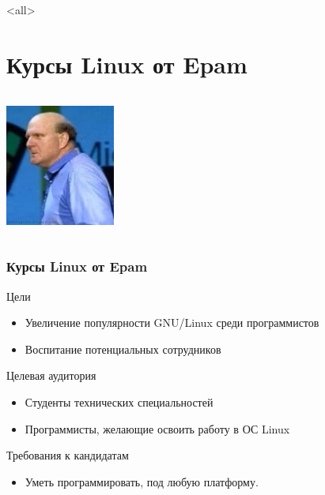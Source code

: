 \mode<all>{}

\section[Epam]{Курсы Linux от Epam}

\begin{frame}{}
	\begin{columns}
		\Huge
		\center\includegraphics[height=4cm]{steve_ballmer}
	\end{columns}
\end{frame}

\begin{frame}
	\frametitle{Курсы Linux от Epam}

	\begin{block}{Цели}
		\begin{itemize}
			\item Увеличение популярности GNU/Linux среди программистов
			\item Воспитание потенциальных сотрудников
		\end{itemize}
	\end{block}

	\begin{block}{Целевая аудитория}
		\begin{itemize}
			\item Студенты технических специальностей
			\item Программисты, желающие освоить работу в ОС Linux
		\end{itemize}
	\end{block}

	\begin{block}{Требования к кандидатам}
		\begin{itemize}
			\item Уметь программировать, под любую платформу.
		\end{itemize}
	\end{block}

\end{frame}

